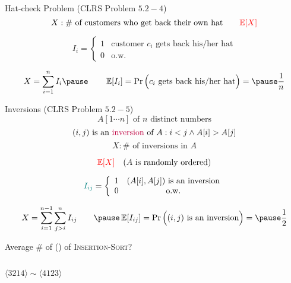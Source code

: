 
\begin{frame}{}
  \begin{exampleblock}{Hat-check Problem (CLRS Problem $5.2-4$)}
    \[
      X: \# \text{ of customers who get back their own hat} \qquad \textcolor{red}{\operatorname*{\mathbb{E}}[X]}
    \]
  \end{exampleblock}

  \pause
  \[
    I_i = \left\{\begin{array}{lc}
      1 & \text{customer } c_i \text{ gets back his/her hat} \\
      0 & \text{o.w.}
    \end{array}\right.
  \]

  \pause
  \[
    X = \sum_{i=1}^{n} I_i \pause \qquad \E[I_i] = \Pr\Big( c_i \text{ gets back his/her hat} \Big) = \pause \frac{1}{n}
  \]
\end{frame}

\begin{frame}{}
  \begin{exampleblock}{Inversions (CLRS Problem $5.2-5$)}
    \[
      A[1 \cdots n] \text{ of } n \text{ distinct numbers}
    \]
    \[
      (i,j) \text{ is an \textcolor{purple}{inversion} of } A : i < j \land A[i] > A[j]
    \]
    \[
      X: \# \text{ of inversions in } A
    \]

    \pause
    \[
      \textcolor{red}{\operatorname*{\mathbb{E}}[X]} \quad (A \text{ is randomly ordered})
    \]
  \end{exampleblock}

  \pause
  \[
    \textcolor{teal}{I_{ij}} = \left\{\begin{array}{lc}
      1 & (A[i], A[j]) \text{ is an inversion} \\
      0 & \text{o.w.}
    \end{array}\right.
  \]

  \[
    X = \sum_{i=1}^{n-1} \sum_{j>i}^{n} I_{ij} \qquad \pause \E[I_{ij}] = \Pr\Big((i,j) \text{ is an inversion}\Big) = \pause \frac{1}{2}
  \]
\end{frame}

\begin{frame}{}
  \centerline{ Average \# of  () of \textsc{Insertion-Sort}?}

  \vspace{0.30cm}
  \begin{columns}
      \pause
      \pause
      \[
	\langle 3214 \rangle \sim \langle 4123 \rangle
      \]
  \end{columns}
\end{frame}
